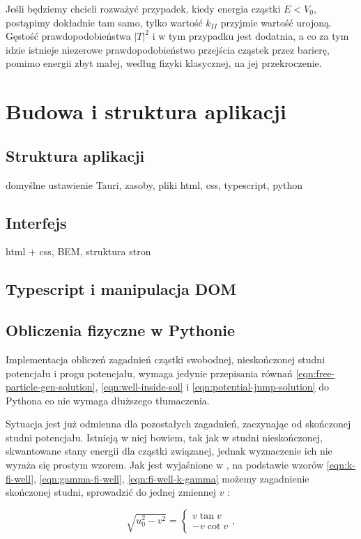 \documentclass{SGGW-thesis}
\begin{document}
	Jeśli będziemy chcieli rozważyć przypadek, kiedy energia cząstki $E < V_0$, postąpimy dokładnie tam samo, tylko wartość $k_{II}$ przyjmie wartość urojoną. Gęstość prawdopodobieństwa $|T|^2$ i w tym przypadku jest dodatnia, a co za tym idzie istnieje niezerowe prawdopodobieństwo przejścia cząstek przez barierę, pomimo energii zbyt małej, według fizyki klasycznej, na jej przekroczenie.
	
	
\chapter{Budowa i struktura aplikacji}
	\section{Struktura aplikacji}
	domyślne ustawienie Tauri, zasoby, pliki html, css, typescript, python
	\section{Interfejs}
	html + css, BEM, struktura stron
	\section{Typescript i manipulacja DOM}
	\section{Obliczenia fizyczne w Pythonie}
		Implementacja obliczeń zagadnień cząstki swobodnej, nieskończonej studni potencjału i progu potencjału, wymaga jedynie przepisania równań \ref{eqn:free-particle-gen-solution}, \ref{eqn:well-inside-sol} i \ref{eqn:potential-jump-solution} do Pythona co nie wymaga dłuższego tłumaczenia.
		
		Sytuacja jest już odmienna dla pozostałych zagadnień, zaczynając od skończonej studni potencjału. Istnieją w niej bowiem, tak jak w studni nieskończonej, skwantowane stany energii dla cząstki związanej, jednak wyznaczenie ich nie wyraża się prostym wzorem. Jak jest wyjaśnione w \cite{wikipedia-well}, na podstawie wzorów \ref{eqn:k-fi-well}, \ref{eqn:gamma-fi-well}, \ref{eqn:fi-well-k-gamma} możemy zagadnienie skończonej studni, sprowadzić do jednej zmiennej $v$ :
		
		\begin{equation}\label{eqn:fi-well-vu}
			\sqrt{u_0^2-v^2} = 
			\left\{
		\begin{matrix}
			v\tan v \\ -v\cot v 
		\end{matrix}\right. ,
		\end{equation}
		
\end{document}
